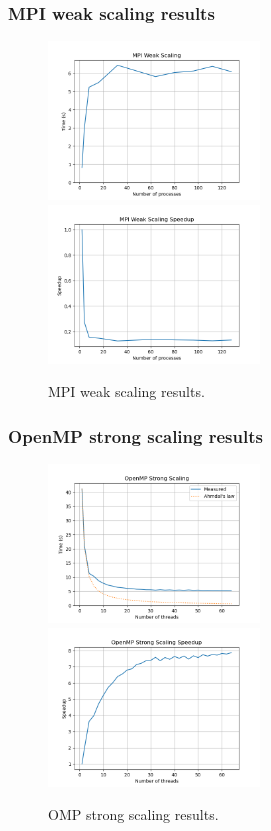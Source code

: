 \documentclass{beamer}
\begin{document}
\begin{frame}
    \frametitle{MPI weak scaling results}
    \begin{figure}
        \centering
        \includegraphics[width=0.5\textwidth]{../images/mpi_weak_scaling.png}
        \includegraphics[width=0.5\textwidth]{../images/mpi_weak_scaling_speedup.png}
        \caption{MPI weak scaling results.}
    \end{figure}
\end{frame}


\begin{frame}
    \frametitle{OpenMP strong scaling results}
    \begin{figure}
        \centering
        \includegraphics[width=0.5\textwidth]{../images/omp_strong_scaling.png}
        \includegraphics[width=0.5\textwidth]{../images/omp_strong_scaling_speedup.png}
        \caption{OMP strong scaling results.}
    \end{figure}
\end{frame}
\end{document}
